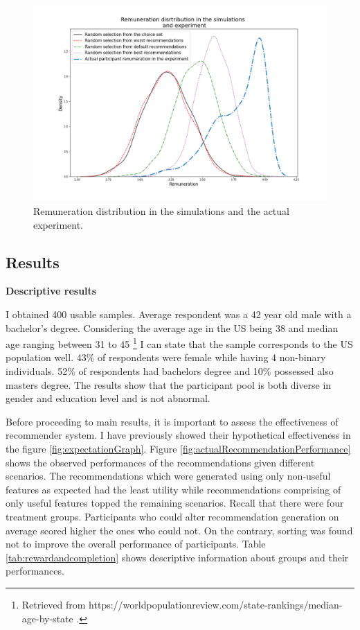 \documentclass[a4paper,12pt]{article}
\begin{document}
\begin{figure}
    \centering
    \includegraphics[width=0.99\linewidth]{staticFiles/AverageRemunerationWorstToBest.png}
    \caption{Remuneration distribution in the simulations and the actual experiment.}
    \label{fig:averageRemuneration}
\end{figure}




\subsection{Results}

\textbf{Descriptive results}

I obtained 400 usable samples. Average respondent was a 42 year old male with a bachelor's degree. Considering the average age in the US being 38 and median age ranging between 31 to 45 \footnote{Retrieved from https://worldpopulationreview.com/state-rankings/median-age-by-state .} I can state that the sample corresponds to the US population well. 43\% of respondents were female while having 4 non-binary individuals. 52\% of respondents had bachelors degree and 10\% possessed also masters degree. The results show that the participant pool is both diverse in gender and education level and is not abnormal.

Before proceeding to main results, it is important to assess the effectiveness of recommender system. I have previously showed their hypothetical effectiveness in the figure \ref{fig:expectationGraph}. Figure \ref{fig:actualRecommendationPerformance} shows the observed performances of the recommendations given different scenarios. The recommendations which were generated using only non-useful features as expected had the least utility while recommendations comprising of only useful features topped the remaining scenarios. Recall that there were four treatment groups. Participants who could alter recommendation generation on average scored higher the ones who could not. On the contrary, sorting was found not to improve the overall performance of participants. Table \ref{tab:rewardandcompletion} shows  descriptive  information about groups and their performances.
\end{document}

